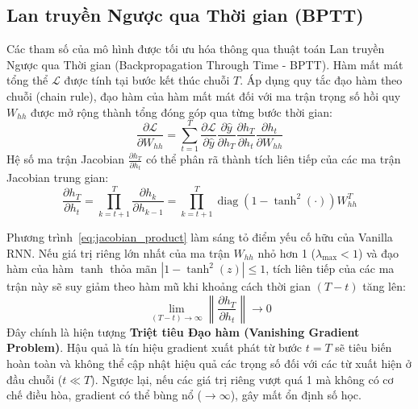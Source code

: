 \documentclass[11pt,a4paper]{article}
\begin{document}
\subsection{Lan truyền Ngược qua Thời gian (BPTT)}
Các tham số của mô hình được tối ưu hóa thông qua thuật toán Lan truyền Ngược qua Thời gian (Backpropagation Through Time - BPTT). Hàm mất mát tổng thể $\mathcal{L}$ được tính tại bước kết thúc chuỗi $T$. Áp dụng quy tắc đạo hàm theo chuỗi (chain rule), đạo hàm của hàm mất mát đối với ma trận trọng số hồi quy $W_{hh}$ được mở rộng thành tổng đóng góp qua từng bước thời gian:
\begin{equation}
\frac{\partial \mathcal{L}}{\partial W_{hh}} = \sum_{t=1}^{T} \frac{\partial \mathcal{L}}{\partial \hat{y}} \frac{\partial \hat{y}}{\partial h_T} \frac{\partial h_T}{\partial h_t} \frac{\partial h_t}{\partial W_{hh}}
\end{equation}
Hệ số ma trận Jacobian $\frac{\partial h_T}{\partial h_t}$ có thể phân rã thành tích liên tiếp của các ma trận Jacobian trung gian:
\begin{equation}
\frac{\partial h_T}{\partial h_t} = \prod_{k=t+1}^{T} \frac{\partial h_k}{\partial h_{k-1}} = \prod_{k=t+1}^{T} \operatorname{diag}\left(1 - \tanh^2(\cdot)\right) W_{hh}^T
\label{eq:jacobian_product}
\end{equation}

Phương trình~\eqref{eq:jacobian_product} làm sáng tỏ điểm yếu cố hữu của Vanilla RNN. Nếu giá trị riêng lớn nhất của ma trận $W_{hh}$ nhỏ hơn 1 ($\lambda_{\max} < 1$) và đạo hàm của hàm $\tanh$ thỏa mãn $|1 - \tanh^2(z)| \le 1$, tích liên tiếp của các ma trận này sẽ suy giảm theo hàm mũ khi khoảng cách thời gian $(T - t)$ tăng lên:
\begin{equation}
\lim_{(T - t) \to \infty} \left\| \frac{\partial h_T}{\partial h_t} \right\| \to 0
\end{equation}
Đây chính là hiện tượng \textbf{Triệt tiêu Đạo hàm (Vanishing Gradient Problem)}. Hậu quả là tín hiệu gradient xuất phát từ bước $t = T$ sẽ tiêu biến hoàn toàn và không thể cập nhật hiệu quả các trọng số đối với các từ xuất hiện ở đầu chuỗi ($t \ll T$). Ngược lại, nếu các giá trị riêng vượt quá 1 mà không có cơ chế điều hòa, gradient có thể bùng nổ ($\to \infty$), gây mất ổn định số học.
\end{document}

